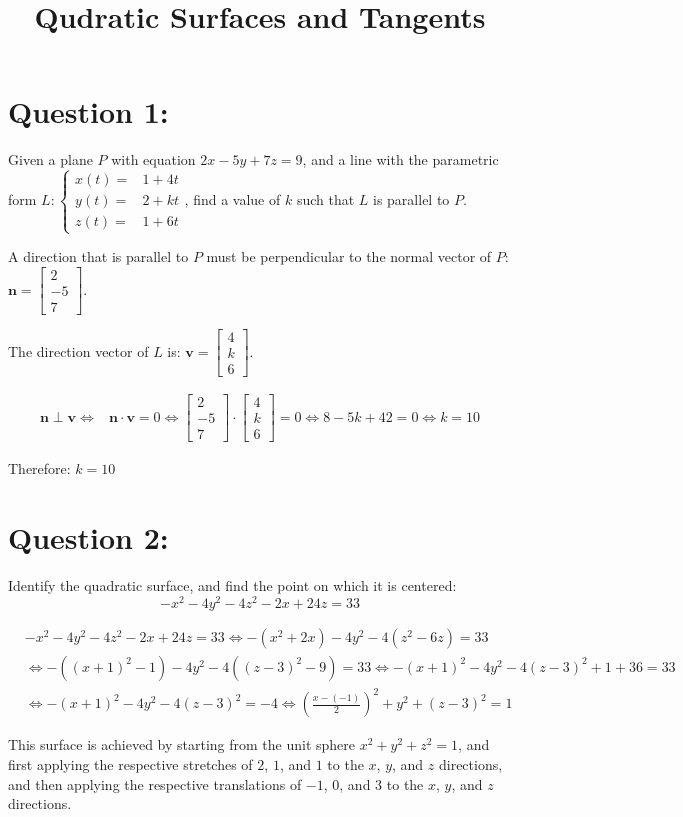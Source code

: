 \documentclass{article}
\title{Qudratic Surfaces and Tangents}
\date{}
\newcommand{\colvec}[3]{\begin{bmatrix} #1 \\ #2 \\ #3 \end{bmatrix}}
\newcommand{\dr}[1]{\textcolor{dark_red}{#1}}
\begin{document}
\maketitle

\section*{Question 1:}

Given a plane \(P\) with equation \(2x - 5y + 7z = 9\), and a line with the parametric form \(L: \left\{\begin{array}{rl} x(t) = & 1 + 4t \\ y(t) = & 2 + kt \\ z(t) = & 1 + 6t \end{array}\right.\), find a value of \(k\) such that \(L\) is parallel to \(P\).

\dr{A direction that is parallel to \(P\) must be perpendicular to the normal vector of \(P\): \(\mathbf{n} = \colvec{2}{-5}{7}\).} 

\dr{The direction vector of \(L\) is: \(\mathbf{v} = \colvec{4}{k}{6}\).}

\dr{\begin{align*}
\mathbf{n} \perp \mathbf{v} \iff & \mathbf{n} \cdot \mathbf{v} = 0 
\iff \colvec{2}{-5}{7} \cdot \colvec{4}{k}{6} = 0 
\iff 8 - 5k + 42 = 0 
\iff k = 10
\end{align*}}

\dr{Therefore: \(k = 10\)}



\section*{Question 2:}

Identify the quadratic surface, and find the point on which it is centered:
\[-x^2 - 4y^2 - 4z^2 - 2x + 24z = 33\]

\dr{\begin{align*}
& -x^2 - 4y^2 - 4z^2 - 2x + 24z = 33 
 \iff -(x^2 + 2x) - 4y^2 - 4(z^2 - 6z) = 33 \\
& \iff -((x+1)^2 - 1) - 4y^2 - 4((z-3)^2 - 9) = 33 
 \iff -(x+1)^2 - 4y^2 - 4(z-3)^2 + 1 + 36 = 33 \\
& \iff -(x+1)^2 - 4y^2 - 4(z-3)^2 = -4 
 \iff \left(\frac{x-(-1)}{2}\right)^2 + y^2 + (z-3)^2 = 1
\end{align*}}

\dr{This surface is achieved by starting from the unit sphere \(x^2 + y^2 + z^2 = 1\), and first applying the respective stretches of \(2\), \(1\), and \(1\) to the \(x\), \(y\), and \(z\) directions, and then applying the respective translations of \(-1\), \(0\), and \(3\) to the \(x\), \(y\), and \(z\) directions.}
\end{document}
